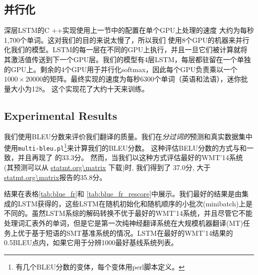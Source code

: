\subsection{并行化}

深层LSTM的C ++实现使用上一节中的配置在单个GPU上处理的速度
大约为每秒1,700个单词。这对我们的目的来说太慢了，所以我们
使用8个GPU的机器来并行化我们的模型。LSTM的每一层在不同的GPU上执行，并且一旦它们被计算就将其激活值传送到下一个GPU层。我们的模型有4层LSTM，每层都驻留在一个单独的GPU上。剩余的4个GPU用于并行化softmax，因此每个GPU负责乘以一个$1000\times 20000$的矩阵。最终实现的速度为每秒6300个单词（英语和法语），迷你批量大小为128。
这个实现花了大约十天来训练。

\subsection{Experimental Results}

我们使用BLEU分数\cite{bleu}来评价我们翻译的质量。我们在\emph{分过词的}预测和真实数据集中使用\texttt{multi-bleu.pl}\footnote{有几个BLEU分数的变体，每个变体用perl脚本定义。}来计算我们的BLEU分数。
这种评估BELU分数的方式与\cite{cho14}和\cite{bog14}一致，并且再现了
\cite{wmt14_en_fr}的33.3分。
然而，当我们以这种方式评估最好的WMT'14系统 \cite{durrani-EtAl:2014:W14-33}
(其预测可以从 \url{statmt.org\matrix} 下载)时, 我们得到了   
37.0分, 大于 \url{statmt.org\matrix}报告的35.8分。  





结果在表格\ref{tab:blue_fr}和
\ref{tab:blue_fr_rescore}中展示。我们最好的结果是由集成的LSTM获得的，这些LSTM在随机初始化和随机顺序的小批次(minibatch)上是不同的。虽然LSTM系综的解码转换不优于最好的WMT'14系统，并且尽管它不能处理词汇表外的单词，但是它是第一次纯神经翻译系统在大规模机器翻译(MT)任务上优于基于短语的SMT基准系统的情况。LSTM在最好的WMT'14结果的0.5BLEU点内，如果它用于分辨1000最好基线系统列表。

